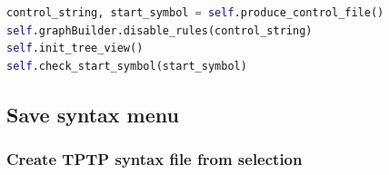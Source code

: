 \begin{lstlisting}[language=Python, basicstyle=\scriptsize	,caption= Reduce TPTP syntax with selection,label= lst:ImplementationGUIReduceTPTPSelection]
control_string, start_symbol = self.produce_control_file()
self.graphBuilder.disable_rules(control_string)
self.init_tree_view()
self.check_start_symbol(start_symbol)
\end{lstlisting}
\subsection{Save syntax menu}\label{sec:ImplementationGUISaveSyntaxMenu}
\subsubsection{Create \ac{TPTP} syntax file from selection}\label{sec:ImplementationGUICreateTPTPFromSelection}

